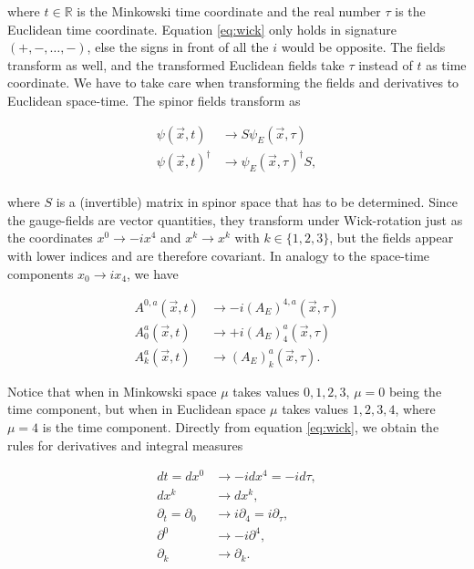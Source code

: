 \documentclass{article}
\theoremstyle{plain} %
\theoremstyle{convention} %
\theoremstyle{remark} %
\numberwithin{equation}{section}
\begin{document}
where $t \in \mathbb{R}$ is the Minkowski time coordinate and the real number $\tau$ is the Euclidean time coordinate. Equation \eqref{eq:wick} only holds in signature $(+,-,\dots,-)$, else the signs in front of all the $i$ would be opposite. The fields transform as well, and the transformed Euclidean fields take $\tau$ instead of $t$ as time coordinate. We have to take care when transforming the fields and derivatives to Euclidean space-time. The spinor fields transform as

\begin{align*}
    \psi(\vec{x}, t) &\longrightarrow S \psi_E(\vec{x}, \tau) \\
    \psi(\vec{x}, t)^{\dagger} &\longrightarrow \psi_E(\vec{x}, \tau)^{\dagger} S, \\
\end{align*}

where $S$ is a (invertible) matrix in spinor space that has to be determined. Since the gauge-fields are vector quantities, they transform under Wick-rotation just as the coordinates $x^0 \to -ix^4$ and $x^k \to x^k$ with $k \in \{1, 2, 3\}$, but the fields appear with lower indices and are therefore covariant. In analogy to the space-time components $x_0 \to ix_4$, we have

\begin{align*}
    A^{0,a}(\vec{x}, t) &\longrightarrow - i (A_E)^{4,a}(\vec{x}, \tau) \\
    A_0^a(\vec{x}, t)   &\longrightarrow + i (A_E)_4^a(\vec{x}, \tau) \\
    A_k^a(\vec{x}, t)   &\longrightarrow (A_E)_k^a(\vec{x}, \tau).
\end{align*}

Notice that when in Minkowski space $\mu$ takes values $0, 1, 2, 3$, $\mu = 0$ being the time component, but when in Euclidean space $\mu$ takes values $1, 2, 3, 4$, where $\mu = 4$ is the time component. Directly from equation \eqref{eq:wick}, we obtain the rules for derivatives and integral measures

\begin{align*}
    dt = dx^0 &\longrightarrow - i d x^4 = - i d \tau, \\
    dx^k &\longrightarrow dx^k, \\
    \partial_t = \partial_0 &\longrightarrow i \partial_4 = i \partial_{\tau}, \\
    \partial^0 &\longrightarrow - i \partial^4, \\
    \partial_k &\longrightarrow \partial_k.
\end{align*}
\end{document}
